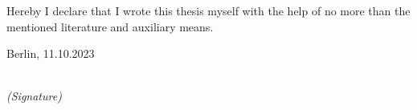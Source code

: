 \newpage

\thispagestyle{empty}

\begin{large}

\vspace*{6cm}

\noindent
Hereby I declare that I wrote this thesis myself with the help of no more than the mentioned literature and auxiliary means.
\vspace{2cm}

\noindent
Berlin, 11.10.2023

\vspace{3cm}

\hspace*{7cm}%
\dotfill\\
\hspace*{8.5cm}%
\textit{(Signature)}

\end{large}
